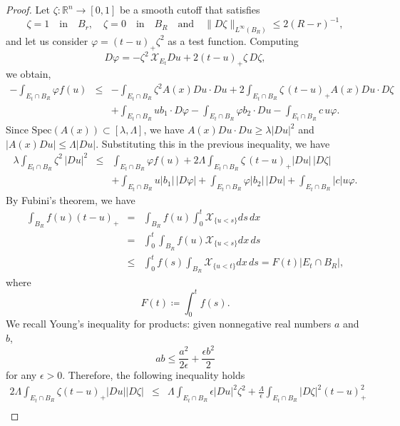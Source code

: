\documentclass[12pt,a4paper]{amsart}
\numberwithin{equation}{section} %
\theoremstyle{definition}
\theoremstyle{remark}
\begin{document}
\begin{proof}
Let $\zeta \colon \mathbb{R}^n \to [0,1]$ be a smooth cutoff that satisfies
$$
    \zeta = 1 \quad \mbox{in} \quad B_r, \quad \zeta = 0 \quad \mbox{in} \quad B_R \quad \mbox{and} \quad \|D\zeta\|_{L^\infty(B_R)} \leq 2(R-r)^{-1},  
$$
and let us consider $\varphi = (t-u)_+ \zeta^2$ as a test function. Computing
$$
    D\varphi = -\zeta^2\, \mathcal{X}_{E_t}Du + 2(t-u)_+ \zeta\, D\zeta,
$$
we obtain,
\begin{eqnarray*}
        -\int_{E_t\cap B_R} \varphi f(u) & \leq & -\int_{E_t\cap B_R} \zeta^2 A(x)Du \cdot Du + 2\int_{E_t\cap B_R} \zeta\, (t-u)_+ A(x)Du \cdot D\zeta\\
        & & + \int_{E_t \cap B_R}u b_1 \cdot D\varphi - \int_{E_t\cap B_R} \varphi b_2 \cdot Du - \int_{E_t \cap B_R}c\,u \varphi.
\end{eqnarray*}
Since $\mbox{Spec}(A(x)) \subset [\lambda,\Lambda]$, we have $A(x)Du \cdot Du \geq \lambda |Du|^2$ and $|A(x)Du|\leq \Lambda |Du|$. Substituting this in the previous inequality, we have
\begin{eqnarray*}
        \lambda \int_{E_t\cap B_R} \zeta^2\, |Du|^2  & \leq & \int_{E_t\cap B_R} \varphi f(u) + 2\Lambda\int_{E_t\cap B_R} \zeta\, (t-u)_+ |Du|\, |D\zeta|\\
        & &  + \int_{E_t \cap B_R}u |b_1|\, |D\varphi| + \int_{E_t\cap B_R} \varphi |b_2|\,|Du| + \int_{E_t \cap B_R}|c|u \varphi. 
\end{eqnarray*}
By Fubini's theorem, we have 
\begin{eqnarray*}
    \int_{B_R} f(u)(t-u)_+ & = & \int_{B_R}f(u)\int_{0}^{t}\mathcal{X}_{\{u < s \}}ds\, dx\\
    & = & \int_{0}^{t} \int_{B_R} f(u)\mathcal{X}_{\{u < s \}}dx\, ds\\
    & \leq & \int_{0}^{t}f(s) \int_{B_R} \mathcal{X}_{\{u < t \}}dx\, ds = F(t)|E_t \cap B_R|,
\end{eqnarray*}
where 
$$
    F(t) \coloneqq \int_{0}^tf(s).
$$
We recall Young's inequality for products: given  nonnegative real numbers $a$ and $b$, 
\begin{equation}\label{young inequality}
    ab \leq \frac{a^2}{2\epsilon} + \frac{\epsilon b^2}{2}
\end{equation}
for any $\epsilon>0$. Therefore, the following inequality holds
\begin{eqnarray*}
    2\Lambda\int_{E_t \cap B_R} \zeta (t-u)_+|Du||D\zeta| &\leq& \Lambda\int_{E_t \cap B_R} \epsilon |Du|^2\zeta^2 + \frac{\Lambda}{\epsilon}\int_{E_t \cap B_R}|D\zeta|^2(t-u)_+^2\\

\end{eqnarray*}
\end{proof}
\end{document}
